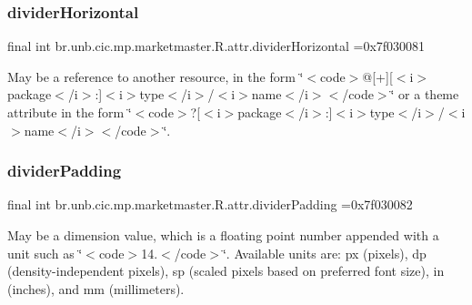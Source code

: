 \subsubsection{\texorpdfstring{divider\+Horizontal}{dividerHorizontal}}
{\footnotesize\ttfamily final int br.\+unb.\+cic.\+mp.\+marketmaster.\+R.\+attr.\+divider\+Horizontal =0x7f030081\hspace{0.3cm}{\ttfamily [static]}}

May be a reference to another resource, in the form \char`\"{}$<$code$>$@\mbox{[}+\mbox{]}\mbox{[}$<$i$>$package$<$/i$>$\+:\mbox{]}$<$i$>$type$<$/i$>$/$<$i$>$name$<$/i$>$$<$/code$>$\char`\"{} or a theme attribute in the form \char`\"{}$<$code$>$?\mbox{[}$<$i$>$package$<$/i$>$\+:\mbox{]}$<$i$>$type$<$/i$>$/$<$i$>$name$<$/i$>$$<$/code$>$\char`\"{}. \mbox{\label{classbr_1_1unb_1_1cic_1_1mp_1_1marketmaster_1_1R_1_1attr_a51b0c23c4507fb538e0d0605e1f8436d}} 
\subsubsection{\texorpdfstring{divider\+Padding}{dividerPadding}}
{\footnotesize\ttfamily final int br.\+unb.\+cic.\+mp.\+marketmaster.\+R.\+attr.\+divider\+Padding =0x7f030082\hspace{0.3cm}{\ttfamily [static]}}

May be a dimension value, which is a floating point number appended with a unit such as \char`\"{}$<$code$>$14.\+5sp$<$/code$>$\char`\"{}. Available units are\+: px (pixels), dp (density-\/independent pixels), sp (scaled pixels based on preferred font size), in (inches), and mm (millimeters). \mbox{\label{classbr_1_1unb_1_1cic_1_1mp_1_1marketmaster_1_1R_1_1attr_a7a7b0eb43f40bd481ca17c2349479072}} 
